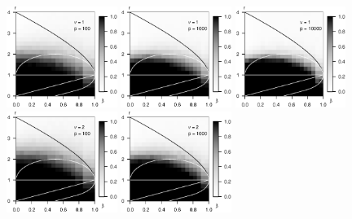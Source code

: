 \begin{figure}
      \centering
      \includegraphics[width=0.32\textwidth]{sim_approx-exact_boundary/simulated_approx-exact_boundary_chi-squared_nu1_p100.eps}
      \includegraphics[width=0.32\textwidth]{sim_approx-exact_boundary/simulated_approx-exact_boundary_chi-squared_nu1_p1000.eps}
      \includegraphics[width=0.32\textwidth]{sim_approx-exact_boundary/simulated_approx-exact_boundary_chi-squared_nu1_p10000.eps}
      \includegraphics[width=0.32\textwidth]{sim_approx-exact_boundary/simulated_approx-exact_boundary_chi-squared_nu2_p100.eps}
      \includegraphics[width=0.32\textwidth]{sim_approx-exact_boundary/simulated_approx-exact_boundary_chi-squared_nu2_p1000.eps}

\end{figure}

